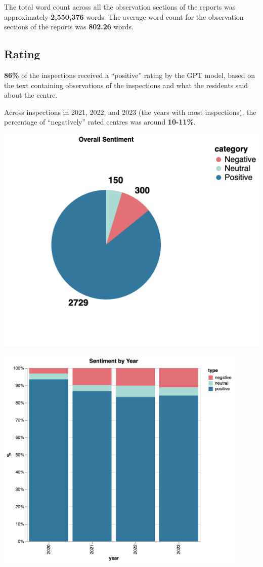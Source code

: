 \documentclass[a4paper,11pt,twoside]{article}
\begin{document}
The total word count across all the observation sections of the reports was approximately \textbf{2,550,376} words. The average word count for the observation sections of the reports was \textbf{802.26} words.
\subsection{Rating}
\label{sec:orgc1d51c0}

\textbf{86\%} of the inspections received a ``positive'' rating by the GPT model, based on the text containing observations of the inspections and what the residents said about the centre.

Across inspections in 2021, 2022, and 2023 (the years with most inspections), the percentage of ``negatively'' rated centres was around \textbf{10-11\%}.

\begin{center}
\includegraphics[width=.9\linewidth]{img/14_rating_pie.png}
\end{center}

\begin{center}
\includegraphics[width=12cm]{img/15_rating_year.png}
\end{center}
\end{document}
